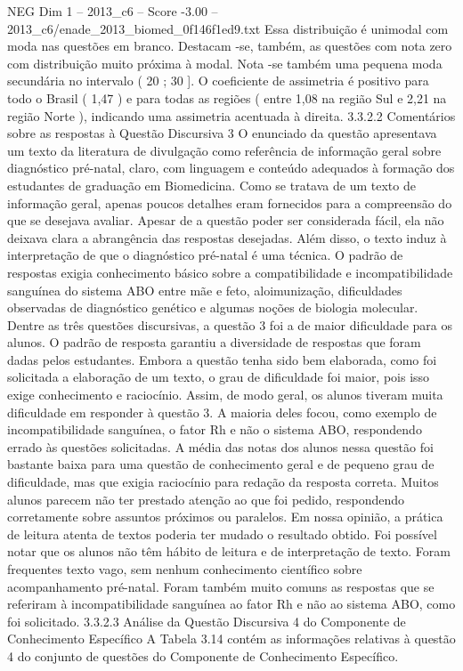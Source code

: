 \begin{textsample}{NEG Dim 1 – 2013\_c6 – Score -3.00 – 2013\_c6/enade\_2013\_biomed\_0f146f1ed9.txt}
Essa distribuição é unimodal com moda nas questões em branco.
Destacam -se, também, as questões com nota zero com distribuição muito próxima à modal.
Nota -se também uma pequena moda secundária no intervalo ( 20 ; 30 ].
O coeficiente de assimetria é positivo para todo o Brasil ( 1,47 ) e para todas as regiões ( entre 1,08 na região Sul e 2,21 na região Norte ), indicando uma assimetria acentuada à direita. 3.3.2.2 Comentários sobre as respostas à Questão Discursiva 3 O enunciado da questão apresentava um texto da literatura de divulgação como referência de informação geral sobre diagnóstico pré-natal, claro, com linguagem e conteúdo adequados à formação dos estudantes de graduação em Biomedicina.
Como se tratava de um texto de informação geral, apenas poucos detalhes eram fornecidos para a compreensão do que se desejava avaliar.
Apesar de a questão poder ser considerada fácil, ela não deixava clara a abrangência das respostas desejadas.
Além disso, o texto induz à interpretação de que o diagnóstico pré-natal é uma técnica.
O padrão de respostas exigia conhecimento básico sobre a compatibilidade e incompatibilidade sanguínea do sistema ABO entre mãe e feto, aloimunização, dificuldades observadas de diagnóstico genético e algumas noções de biologia molecular.
Dentre as três questões discursivas, a questão 3 foi a de maior dificuldade para os alunos.
O padrão de resposta garantiu a diversidade de respostas que foram dadas pelos estudantes.
Embora a questão tenha sido bem elaborada, como foi solicitada a elaboração de um texto, o grau de dificuldade foi maior, pois isso exige conhecimento e raciocínio.
Assim, de modo geral, os alunos tiveram muita dificuldade em responder à questão 3.
A maioria deles focou, como exemplo de incompatibilidade sanguínea, o fator Rh e não o sistema ABO, respondendo errado às questões solicitadas.
A média das notas dos alunos nessa questão foi bastante baixa para uma questão de conhecimento geral e de pequeno grau de dificuldade, mas que exigia raciocínio para redação da resposta correta.
Muitos alunos parecem não ter prestado atenção ao que foi pedido, respondendo corretamente sobre assuntos próximos ou paralelos.
Em nossa opinião, a prática de leitura atenta de textos poderia ter mudado o resultado obtido.
Foi possível notar que os alunos não têm hábito de leitura e de interpretação de texto.
Foram frequentes texto vago, sem nenhum conhecimento científico sobre acompanhamento pré-natal.
Foram também muito comuns as respostas que se referiram à incompatibilidade sanguínea ao fator Rh e não ao sistema ABO, como foi solicitado. 3.3.2.3 Análise da Questão Discursiva 4 do Componente de Conhecimento Específico A Tabela 3.14 contém as informações relativas à questão 4 do conjunto de questões do Componente de Conhecimento Específico.

\end{textsample}
